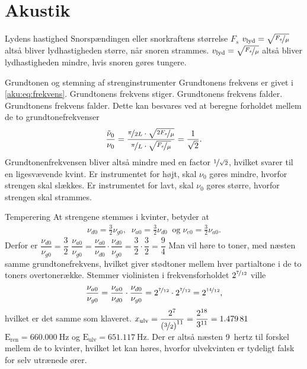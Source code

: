 \documentclass[crop=false, class=memoir]{standalone}
\begin{document}
\section{Akustik}
\begin{opgave}[1]{Lydens hastighed}
\opg Snorspændingen eller snorkraftens størrelse $F_s$
\opg $v_\mathrm{lyd}=\sqrt{\nicefrac{F_s}{\mu}}$ altså bliver lydhastigheden større, når snoren strammes.
\opg $v_\mathrm{lyd}=\sqrt{\nicefrac{F_s}{\mu}}$ altså bliver lydhastigheden mindre, hvis snoren gøres tungere.
\end{opgave}
\begin{opgave}[1]{Grundtonen og stemning af strenginstrumenter}
Grundtonens frekvens er givet i \cref{aku:eq:frekvens}.
\opg Grundtonens frekvens stiger.
\opg Grundtonens frekvens falder.
\opg Grundtonens frekvens falder.
\opg Dette kan besvares ved at beregne forholdet mellem de to grundtonefrekvenser
%
\begin{align*}
    \frac{\tilde \nu_0}{\nu_0} = \frac{\nicefrac{\pi}{2L}\cdot\sqrt{\nicefrac{2F_s}{\mu}}}{\nicefrac{\pi}{L}\cdot\sqrt{\nicefrac{F_s}{\mu}}} = \frac{1}{\sqrt{2}}.
\end{align*}
%
Grundtonenfrekvensen bliver altså mindre med en factor $\nicefrac{1}{\sqrt{2}}$, hvilket svarer til en ligesvævende kvint.
\opg Er instrumentet for højt, skal $\nu_0$ gøres mindre, hvorfor strengen skal slækkes.
\opg Er instrumentet for lavt, skal $\nu_0$ gøres større, hvorfor strengen skal strammes.
\end{opgave}
\begin{opgave}[1]{Temperering}
At strengene stemmes i kvinter, betyder at
%
\begin{align*}
    \nu_{d0} = \frac{3}{2}\nu_{g0}, \;\; \nu_{a0} = \frac{3}{2}\nu_{d0} \;\; \mathrm{og} \; \nu_{e0} = \frac{3}{2}\nu_{a0}.
\end{align*}
Derfor er
\opg $\dfrac{\nu_{d0}}{\nu_{g0}} = \dfrac{3}{2}$
\opg $\dfrac{\nu_{a0}}{\nu_{g0}} = \dfrac{\nu_{a0}}{\nu_{d0}}\cdot\dfrac{\nu_{d0}}{\nu_{g0}} = \dfrac{3}{2}\cdot\dfrac{3}{2} = \dfrac{9}{4}$
\opg Man vil høre to toner, med næsten samme grundtonefrekvens, hvilket giver stødtoner mellem hver partialtone i de to toners overtonerække.
\opg Stemmer violinisten i frekvensforholdet $2^{\nicefrac{7}{12}}$ ville
%
\begin{align*}
    \dfrac{\nu_{a0}}{\nu_{g0}} = \dfrac{\nu_{a0}}{\nu_{d0}}\cdot\dfrac{\nu_{d0}}{\nu_{g0}} = 2^{\nicefrac{7}{12}}\cdot2^{\nicefrac{7}{12}} = 2^{\nicefrac{14}{12}},
\end{align*}
%
hvilket er det samme som klaveret.
\opg $x_\mathrm{ulv} = \dfrac{2^7}{\left(\nicefrac{3}{2}\right)^{11}} = \dfrac{2^{18}}{3^{11}} = \num{1.47981}$ 
\opg $\mathrm{E}_\mathrm{ren} = \SI{660,000}{\hertz}$ og $\mathrm{E}_\mathrm{ulv} = \SI{651,117}{\hertz}$. Der er altså næsten \SI{9}{hertz} til forskel mellem de to kvinter, hvilket let kan høres, hvorfor ulvekvinten er tydeligt falsk for selv utrænede ører.
\end{opgave}
\end{document}
